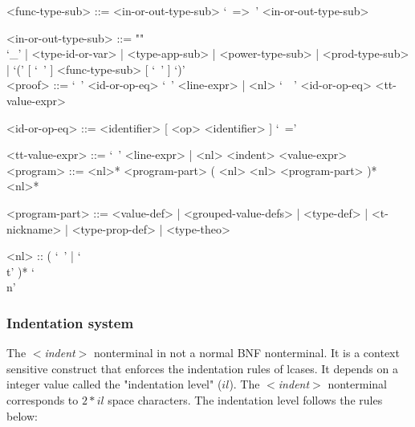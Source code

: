 \documentclass{article}
\begin{document}
\begin{grammar}
<func-type-sub> ::= <in-or-out-type-sub> `\ =>\ ' <in-or-out-type-sub>

<in-or-out-type-sub> ::= ""\\
`_' | <type-id-or-var> | <type-app-sub> | <power-type-sub> | <prod-type-sub> |
`(' [ `\ ' ] <func-type-sub> [ `\ ' ] `)'
\\

<proof> ::= 
`\ ' <id-or-op-eq> `\ ' <line-expr> |
<nl> `\ \ ' <id-or-op-eq>  <tt-value-expr>

<id-or-op-eq> ::= <identifier> [ <op> <identifier> ] `\ ='

<tt-value-expr> ::= `\ ' <line-expr> | <nl> <indent> <value-expr>
\\

<program> ::=
<nl>* <program-part> ( <nl> <nl> <program-part> )* <nl>*

<program-part> ::=
<value-def> | <grouped-value-defs> | <type-def> | <t-nickname> |
<type-prop-def> | <type-theo>

<nl> :: ( `\ ' | `\\t' )* `\\n'
\end{grammar}

\newpage

\subsubsection{Indentation system}
\label{subsubsec:indsys}

The \textit{$<$indent$>$} nonterminal in not a normal BNF nonterminal. It is a
context sensitive construct that enforces the indentation rules of lcases.
It depends on a integer value called the "indentation level" ($il$).
The \textit{$<$indent$>$} nonterminal corresponds to $2*il$ space characters.
The indentation level follows the rules below:
\end{document}
